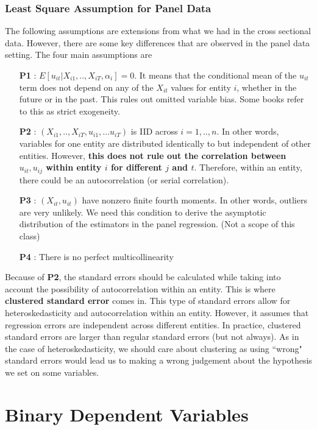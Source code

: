 \documentclass[12pt]{article}
\theoremstyle{definition}
\theoremstyle{property}
\theoremstyle{assumption}
\theoremstyle{example}
\theoremstyle{comment}
\begin{document}
\subsubsection{Least Square Assumption for Panel Data}
The following assumptions are extensions from what we had in the cross sectional data. However, there are some key differences that are observed in the panel data setting. The four main assumptions are
\begin{itemize}
\item [\textbf{P1}]: $E[u_{it}|X_{i1},..,X_{iT},\alpha_i]=0$. It means that the conditional mean of the $u_{it}$ term does not depend on any of the $X_{it}$ values for entity $i$, whether in the future or in the past. This rules out omitted variable bias. Some books refer to this as strict exogeneity. 
\item [\textbf{P2}]: $(X_{i1},..,X_{iT},u_{i1},...u_{iT})$ is IID across $i=1,..,n$. In other words, variables for one entity are distributed identically to but independent of other entities. However, \textbf{this does not rule out the correlation between $u_{it},u_{ij}$ within entity $i$ for different $j$ and $t$}. Therefore, within an entity, there could be an autocorrelation (or serial correlation).  
\item [\textbf{P3}]: $(X_{it},u_{it})$ have nonzero finite fourth moments. In other words, outliers are very unlikely. We need this condition to derive the asymptotic distribution of the estimators in the panel regression. (Not a scope of this class)
\item [\textbf{P4}]: There is no perfect multicollinearity
\end{itemize}
Because of \textbf{P2}, the standard errors should be calculated while taking into account the possibility of autocorrelation within an entity. This is where \textbf{clustered standard error} comes in. This type of standard errors allow for heteroskedasticity and autocorrelation within an entity. However, it assumes that regression errors are independent across different entities. In practice, clustered standard errors are larger than regular standard errors (but not always). As in the case of heteroskedasticity, we should care about clustering as using ``wrong" standard errors would lead us to making a wrong judgement about the hypothesis we set on some variables. \par\medskip


\section{Binary Dependent Variables}
\end{document}
